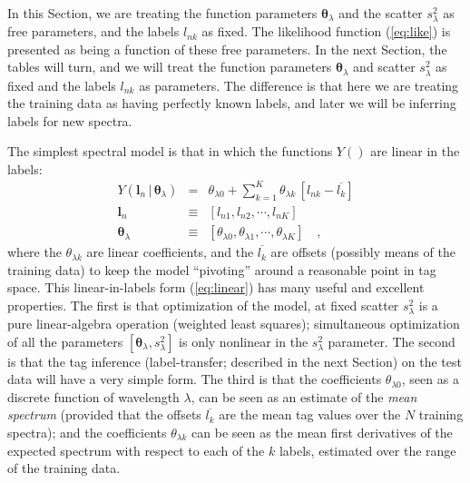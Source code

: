 \documentclass[12pt, preprint]{aastex}
\newcommand{\sectionname}{Section}
\newcommand{\set}[1]{\bm{#1}}
\newcommand{\mean}[1]{\overline{#1}}
\newcommand{\given}{\,|\,}
\begin{document}
In this \sectionname, we are treating the function parameters
$\set{\theta}_\lambda$ and the scatter $s_\lambda^2$ as free parameters, and the
labels $l_{nk}$ as fixed.
The likelihood function (\ref{eq:like}) is presented as being a
function of these free parameters.
In the next \sectionname, the tables will turn, and we will treat the
function parameters $\set{\theta}_\lambda$ and scatter $s_{\lambda}^2$ as fixed and
the labels $l_{nk}$ as parameters.
The difference is that here we are treating the training data as
having perfectly known labels, and later we will be inferring labels for
new spectra.

The simplest spectral model is that in which the functions $Y()$ are
linear in the labels:
\begin{eqnarray}
Y(\set{l}_n\given\set{\theta}_\lambda) &=&
 \theta_{\lambda 0} + \sum_{k=1}^K \theta_{\lambda k}\,[l_{nk} - \mean{l_k}]
\label{eq:linear}\\
\set{l}_n &\equiv& [l_{n1}, l_{n2}, \cdots, l_{nK}]
\\
\set{\theta}_\lambda &\equiv& [\theta_{\lambda 0}, \theta_{\lambda 1}, \cdots, \theta_{\lambda K}]
\quad ,
\end{eqnarray}
where the $\theta_{\lambda k}$ are linear coefficients, and
the $\mean{l_k}$ are offsets (possibly means of the training data) to
keep the model ``pivoting'' around a reasonable point in tag space.
This linear-in-labels form (\ref{eq:linear}) has many useful and
excellent properties.
The first is that optimization of the model, at fixed scatter
$s_\lambda^2$ is a pure linear-algebra operation (weighted least
squares); simultaneous optimization of all the parameters
$[\set{\theta}_\lambda,s_\lambda^2]$ is only nonlinear in the $s_\lambda^2$
parameter.
The second is that the tag inference (label-transfer; described in the
next Section) on the test data will have a very simple form.
The third is that the coefficients $\theta_{\lambda 0}$, seen as a discrete
function of wavelength $\lambda$, can be seen as an estimate of
the \emph{mean spectrum} (provided that the offsets $\mean{l_k}$ are
the mean tag values over the $N$ training spectra); and the
coefficients $\theta_{\lambda k}$ can be seen as the mean first derivatives of
the expected spectrum with respect to each of the $k$ labels, estimated
over the range of the training data.
\end{document}

